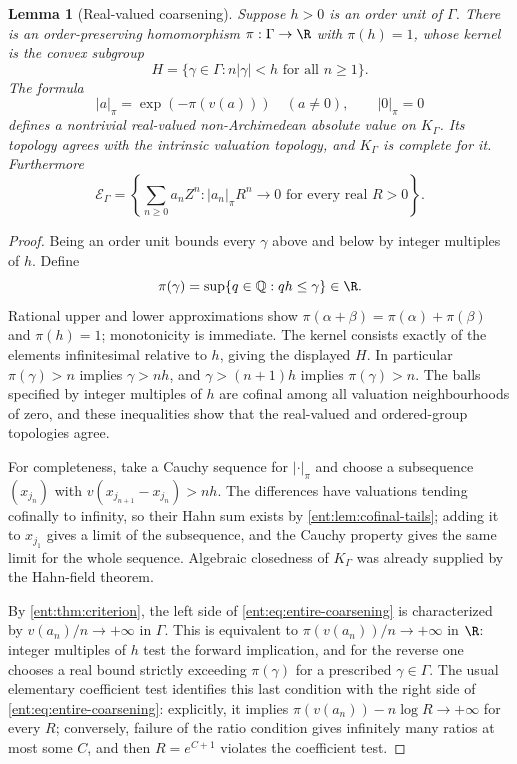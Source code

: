 \documentclass[11pt]{article}
\theoremstyle{plain}
\newtheorem{lemma}[lemma]{Lemma}
\theoremstyle{plain}
\theoremstyle{plain}
\theoremstyle{definition}
\theoremstyle{definition}
\theoremstyle{definition}
\theoremstyle{definition}
\theoremstyle{remark}
\newcommand{\Q}{\mathbb Q}\newcommand{\Z}{\mathbb Z}\newcommand{\N}{\mathbb N}
\newcommand{\K}{K_\Gamma}\newcommand{\KD}{K_\Delta}
\newcommand{\E}{\mathcal E_\Gamma}
\begin{document}
\begin{lemma}[Real-valued coarsening]\label{ent:lem:coarsening}
Suppose $h>0$ is an order unit of $\Gamma$. There is an order-preserving
homomorphism $\pi:\Gamma\to\R$ with $\pi(h)=1$, whose kernel is the convex
subgroup
\[
 H=\{\gamma\in\Gamma:n|\gamma|<h\text{ for all }n\ge1\}.
\]
The formula
\[
 |a|_\pi=\exp(-\pi(v(a)))\quad(a\ne0),\qquad |0|_\pi=0
\]
defines a nontrivial real-valued non-Archimedean absolute value on $\K$. Its
topology agrees with the intrinsic valuation topology, and $\K$ is complete
for it. Furthermore
\begin{equation}\label{ent:eq:entire-coarsening}
 \E=\left\{\sum_{n\ge0}a_nZ^n:
           |a_n|_\pi R^n\longrightarrow0\text{ for every real }R>0
     \right\}.
\end{equation}
\end{lemma}
\begin{proof}
Being an order unit bounds every $\gamma$ above and below by integer
multiples of $h$. Define
\[
 \pi(\gamma)=\sup\{q\in\Q:qh\le\gamma\}\in\R.
\]
Rational upper and lower approximations show
$\pi(\alpha+\beta)=\pi(\alpha)+\pi(\beta)$ and $\pi(h)=1$; monotonicity is
immediate. The kernel consists exactly of the elements infinitesimal relative
to $h$, giving the displayed $H$. In particular $\pi(\gamma)>n$ implies
$\gamma>nh$, and $\gamma>(n+1)h$ implies $\pi(\gamma)>n$. The balls specified
by integer multiples of $h$ are cofinal among all valuation neighbourhoods of
zero, and these inequalities show that the real-valued and ordered-group
topologies agree.

For completeness, take a Cauchy sequence for $|\cdot|_\pi$ and choose a
subsequence $(x_{j_n})$ with $v(x_{j_{n+1}}-x_{j_n})>nh$. The differences
have valuations tending cofinally to infinity, so their Hahn sum exists by
\cref{ent:lem:cofinal-tails}; adding it to $x_{j_1}$ gives a limit of the
subsequence, and the Cauchy property gives the same limit for the whole
sequence. Algebraic closedness of $\K$ was already supplied by the Hahn-field
theorem.

By \cref{ent:thm:criterion}, the left side of
\eqref{ent:eq:entire-coarsening} is characterized by $v(a_n)/n\to+\infty$ in
$\Gamma$. This is equivalent to $\pi(v(a_n))/n\to+\infty$ in $\R$: integer
multiples of $h$ test the forward implication, and for the reverse one
chooses a real bound strictly exceeding $\pi(\gamma)$ for a prescribed
$\gamma\in\Gamma$. The usual elementary coefficient test identifies this last
condition with the right side of \eqref{ent:eq:entire-coarsening}:
explicitly, it implies $\pi(v(a_n))-n\log R\to+\infty$ for every $R$;
conversely, failure of the ratio condition gives infinitely many ratios at
most some $C$, and then $R=e^{C+1}$ violates the coefficient test.
\end{proof}
\end{document}

